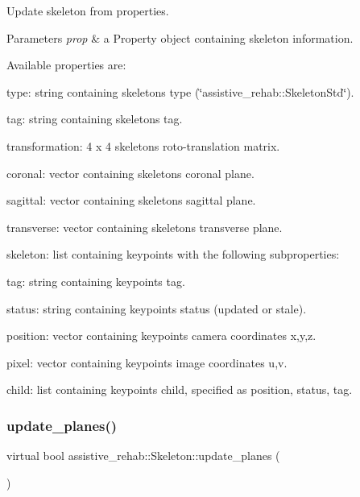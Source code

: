 Update skeleton from properties. 


\begin{DoxyParams}{Parameters}
{\em prop} & a Property object containing skeleton information.\\
\hline
\end{DoxyParams}
Available properties are\+:
\begin{DoxyItemize}
\item type\+: string containing skeleton\textquotesingle{}s type (\char`\"{}assistive\+\_\+rehab\+::\+Skeleton\+Std\char`\"{}).
\item tag\+: string containing skeleton\textquotesingle{}s tag.
\item transformation\+: 4 x 4 skeleton\textquotesingle{}s roto-\/translation matrix.
\item coronal\+: vector containing skeleton\textquotesingle{}s coronal plane.
\item sagittal\+: vector containing skeleton\textquotesingle{}s sagittal plane.
\item transverse\+: vector containing skeleton\textquotesingle{}s transverse plane.
\item skeleton\+: list containing keypoints with the following subproperties\+:
\begin{DoxyItemize}
\item tag\+: string containing keypoint\textquotesingle{}s tag.
\item status\+: string containing keypoint\textquotesingle{}s status (updated or stale).
\item position\+: vector containing keypoint\textquotesingle{}s camera coordinates x,y,z.
\item pixel\+: vector containing keypoint\textquotesingle{}s image coordinates u,v.
\item child\+: list containing keypoint\textquotesingle{}s child, specified as position, status, tag. 
\end{DoxyItemize}
\end{DoxyItemize}\mbox{\label{classassistive__rehab_1_1Skeleton_af0ee2be195f804a9562cb184a2be0bad}} 
\subsubsection{\texorpdfstring{update\_planes()}{update\_planes()}}
{\footnotesize\ttfamily virtual bool assistive\+\_\+rehab\+::\+Skeleton\+::update\+\_\+planes (\begin{DoxyParamCaption}{ }\end{DoxyParamCaption})\hspace{0.3cm}{\ttfamily [pure virtual]}}



